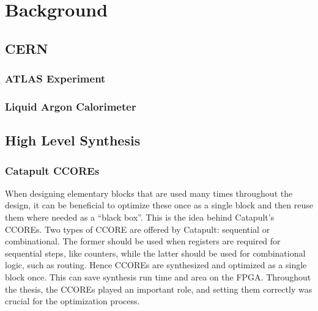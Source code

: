 \chapter{Background}\label{sec:background}
\parskip4pt \parindent12pt

\section{CERN}\label{sec:cern}

\subsection{ATLAS Experiment}\label{sec:atlas-experiment}

\subsection{Liquid Argon Calorimeter}\label{sec:liquid-argon-calorimeter}

\section{High Level Synthesis}\label{sec:high-level-synthesis}

\subsection{Catapult CCOREs}

When designing elementary blocks that are used many times throughout the design, it can be beneficial to optimize these once as a single block and then reuse them where needed as a ``black box''. This is the idea behind Catapult's CCOREs. Two types of CCORE are offered by Catapult: sequential or combinational. The former should be used when registers are required for sequential steps, like counters, while the latter should be used for combinational logic, such as routing. Hence CCOREs are synthesized and optimized as a single block once. This can save synthesis run time and area on the FPGA. Throughout the thesis, the CCOREs played an important role, and setting them correctly was crucial for the optimization process.